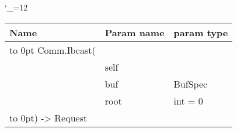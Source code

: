 \begingroup \catcode`\_=12 \tt
\begin{tabular}{lll}
\toprule
\textrm{Name}&\textrm{Param name}&\textrm{param type}\\
\midrule
\hbox to 0pt {Comm.Ibcast(\hss}\\
& self\\
& buf & BufSpec\\
& root & int = 0\\
\hbox to 0pt{) -> Request\hss}\\
\bottomrule
\end{tabular}
\endgroup
